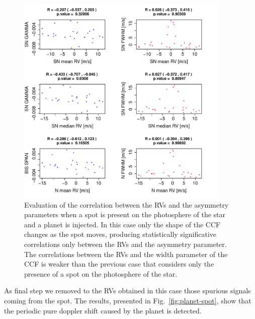 \documentclass[11pt, oneside]{article}
\begin{document}
{\begin{figure}[htbp]
   \centering
\includegraphics[height = 4in]{SOAP_SPOT_PLANET_Comparison_para_SN.pdf} 
   \caption{Evaluation of the correlation between the RVs and the asymmetry parameters when a spot is present on the photosphere of the star and a planet is injected.  In this case only the shape of the CCF changes as the spot moves, producing statistically significative correlations only between the RVs and the asymmetry parameter. The correlations between the RVs and the width parameter of the CCF is weaker than the previous case that considers only the presence of a spot on the photosphere of the star.}
    \label{fig:spot.plus.planet.corr}
\end{figure}

As final step we removed to the RVs obtained in this case those spurious signals coming from the spot. The results, presented in Fig.~\ref{fig:planet-spot}, show that the periodic pure doppler shift caused by the planet is detected.

}
\end{document}
